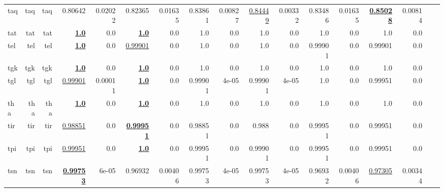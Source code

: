 \documentclass[11pt]{article}
\begin{document}
\begin{table*}[h]
{\begin{tabular}{lrrrrrrrrrrrrrrrr}
taq         & taq         & taq         & 0.80642         & 0.02022         & 0.82365         & 0.01635         & 0.83861         & 0.00827         & \underline{0.84449}         & 0.00332         & 0.83486         & 0.01635         & \textbf{\underline{0.85028}}         & 0.00814         \\
tat         & tat         & tat         & \textbf{\underline{1.0}}         & 0.0         & \textbf{\underline{1.0}}         & 0.0         & 1.0         & 0.0         & 1.0         & 0.0         & 1.0         & 0.0         & 1.0         & 0.0         \\
tel         & tel         & tel         & \textbf{\underline{1.0}}         & 0.0         & \underline{0.99901}         & 0.0         & 1.0         & 0.0         & 1.0         & 0.0         & 0.99901         & 0.0         & 0.99901         & 0.0         \\
tgk         & tgk         & tgk         & \textbf{\underline{1.0}}         & 0.0         & \textbf{\underline{1.0}}         & 0.0         & 1.0         & 0.0         & 1.0         & 0.0         & 1.0         & 0.0         & 1.0         & 0.0         \\
tgl         & tgl         & tgl         & \underline{0.99901}         & 0.00011         & \textbf{\underline{1.0}}         & 0.0         & 0.99901         & 4e-05         & 0.99901         & 4e-05         & 1.0         & 0.0         & 0.99951         & 0.0         \\
tha         & tha         & tha         & \textbf{\underline{1.0}}         & 0.0         & \textbf{\underline{1.0}}         & 0.0         & 1.0         & 0.0         & 1.0         & 0.0         & 1.0         & 0.0         & 1.0         & 0.0         \\
tir         & tir         & tir         & \underline{0.98851}         & 0.0         & \textbf{\underline{0.99951}}         & 0.0         & 0.98851         & 0.0         & 0.988         & 0.0         & 0.99951         & 0.0         & 0.99951         & 0.0         \\
tpi         & tpi         & tpi         & \underline{0.99951}         & 0.0         & \textbf{\underline{1.0}}         & 0.0         & 0.99951         & 0.0         & 0.99901         & 0.0         & 0.99951         & 0.0         & 0.99951         & 0.0         \\
tsn         & tsn         & tsn         & \textbf{\underline{0.99753}}         & 6e-05         & 0.96932         & 0.00406         & 0.99753         & 4e-05         & 0.99753         & 4e-05         & 0.96932         & 0.00406         & \underline{0.97305}         & 0.00344         \\

\end{tabular}}
\end{table*}
\end{document}
